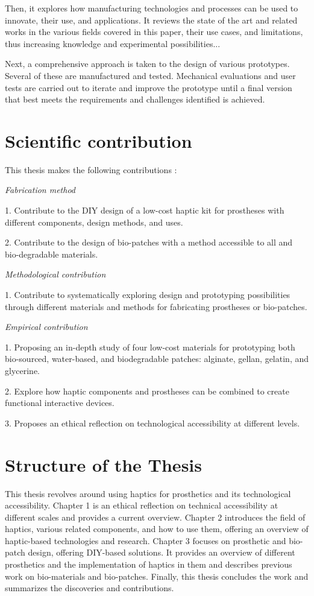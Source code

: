 Then, it explores how manufacturing technologies and processes can be used to innovate, their use, and applications. It reviews the state of the art and related works in the various fields covered in this paper, their use cases, and limitations, thus increasing knowledge and experimental possibilities...

Next, a comprehensive approach is taken to the design of various prototypes. Several of these are manufactured and tested. Mechanical evaluations and user tests are carried out to iterate and improve the prototype until a final version that best meets the requirements and challenges identified is achieved.

\section{Scientific contribution}
This thesis makes the following contributions :

\textit{Fabrication method}

\item 1. Contribute to the DIY design of a low-cost haptic kit for prostheses with different components, design methods, and uses.
\item 2. Contribute to the design of bio-patches with a method accessible to all and bio-degradable materials.

\textit{Methodological contribution}

\item 1. Contribute to systematically exploring design and prototyping possibilities through different materials and methods for fabricating prostheses or bio-patches.

\textit{Empirical contribution}

\item 1. Proposing an in-depth study of four low-cost materials for prototyping both bio-sourced, water-based, and biodegradable patches: alginate, gellan, gelatin, and glycerine. 
\item 2. Explore how haptic components and prostheses can be combined to create functional interactive devices.
\item 3. Proposes an ethical reflection on technological accessibility at different levels.

\section{Structure of the Thesis}
This thesis revolves around using haptics for prosthetics and its technological accessibility. Chapter 1 is an ethical reflection on technical accessibility at different scales and provides a current overview. Chapter 2 introduces the field of haptics, various related components, and how to use them, offering an overview of haptic-based technologies and research. Chapter 3 focuses on prosthetic and bio-patch design, offering DIY-based solutions. It provides an overview of different prosthetics and the implementation of haptics in them and describes previous work on bio-materials and bio-patches. Finally, this thesis concludes the work and summarizes the discoveries and contributions.